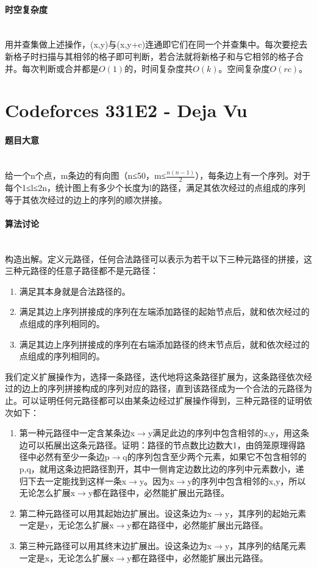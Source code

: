 \documentclass[UTF8]{ctexart}
\newcommand{\myparagraph}[1]{\paragraph{#1}\mbox{}\\}
\theoremstyle{nonumberplain}
\begin{document}
		\myparagraph{时空复杂度}
		
			用并查集做上述操作，(x,y)与(x,y+c)连通即它们在同一个并查集中。每次要挖去新格子时扫描与其相邻的格子即可判断，若合法就将新格子和与它相邻的格子合并。每次判断或合并都是$O(1)$的，时间复杂度共$O(k)$。空间复杂度$O(rc)$。
	
	\section{Codeforces 331E2 - Deja Vu}
		
		\myparagraph{题目大意}
		
			给一个n个点，m条边的有向图（n≤50，m≤$\frac{n(n-1)}{2}$），每条边上有一个序列。对于每个1≤l≤2n，统计图上有多少个长度为l的路径，满足其依次经过的点组成的序列等于其依次经过的边上的序列的顺次拼接。
			
		\myparagraph{算法讨论}
		
			构造出解。定义元路径，任何合法路径可以表示为若干以下三种元路径的拼接，这三种元路径的任意子路径都不是元路径：
			
			\begin{enumerate}
				\item 满足其本身就是合法路径的。
				\item 满足其边上序列拼接成的序列在左端添加路径的起始节点后，就和依次经过的点组成的序列相同的。
				\item 满足其边上序列拼接成的序列在右端添加路径的终末节点后，就和依次经过的点组成的序列相同的。
			\end{enumerate}
			
			我们定义扩展操作为，选择一条路径，迭代地将这条路径扩展为，这条路径依次经过的边上的序列拼接构成的序列对应的路径，直到该路径成为一个合法的元路径为止。可以证明任何元路径都可以由某条边经过扩展操作得到，三种元路径的证明依次如下：
			
			\begin{enumerate}
				\item 第一种元路径中一定含某条边x$\rightarrow$y满足此边的序列中包含相邻的x,y，用这条边可以拓展出这条元路径。证明：路径的节点数比边数大1，由鸽笼原理得路径中必然有至少一条边p$\rightarrow$q的序列包含至少两个元素，如果它不包含相邻的p,q，就用这条边把路径割开，其中一侧肯定边数比边的序列中元素数小，递归下去一定能找到这样一条x$\rightarrow$y。因为x$\rightarrow$y的序列中包含相邻的x,y，所以无论怎么扩展x$\rightarrow$y都在路径中，必然能扩展出元路径。
				\item 第二种元路径可以用其起始边扩展出。设这条边为x$\rightarrow$y，其序列的起始元素一定是y，无论怎么扩展x$\rightarrow$y都在路径中，必然能扩展出元路径。
				\item 第三种元路径可以用其终末边扩展出。设这条边为x$\rightarrow$y，其序列的结尾元素一定是x，无论怎么扩展x$\rightarrow$y都在路径中，必然能扩展出元路径。
			\end{enumerate}
			
\end{document}
